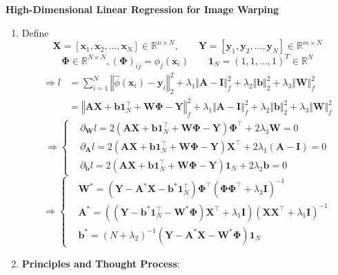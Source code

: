 \documentclass[11pt,letter,notitlepage]{article}
\begin{document}
\begin{solution} \textbf{High-Dimensional Linear Regression for Image Warping}
\begin{enumerate}
	\item
	Define
	\[
	\mathbf{X}
	=
	[\mathbf{x}_1, \mathbf{x}_2, \dots, \mathbf{x}_N] \in \mathbb{R}^{n \times N},
	\qquad
	\mathbf{Y} = [\mathbf{y}_1, \mathbf{y}_2, \dots, \mathbf{y}_N] \in \mathbb{R}^{m \times N}
	\]
	\[
	\mathbf{\Phi} \in \mathbb{R}^{N \times N}, (\mathbf{\Phi})_{ij} = \phi_j(\mathbf{x}_i)
	\qquad
	\mathbf{1}_N = (1,1,\dots,1)^T \in \mathbb{R}^N
	\]
	\begin{align*}
	\Longrightarrow
	l
	&=
	\sum_{i = 1}^N\left\Vert \hat{\phi}(\mathbf{x}_i) - \mathbf{y}_i \right\Vert _2^2 + \lambda_1\Vert \mathbf{A} - \mathbf{I}\Vert_f^2 + \lambda_2 \Vert\mathbf{b} \Vert _2^2 + \lambda_3\Vert \mathbf{W}\Vert_f^2\\
	&=
	\left\Vert \mathbf{A}\mathbf{X} + \mathbf{b}\mathbf{1}_N^\top + \mathbf{W} \mathbf{\Phi} - \mathbf{Y} \right\Vert _f^2
	+
	\lambda_1\Vert \mathbf{A} - \mathbf{I}\Vert_f^2
	+
	\lambda_2 \Vert\mathbf{b} \Vert _2^2
	+
	\lambda_3\Vert \mathbf{W}\Vert_f^2
	\end{align*}
	\begin{equation}
	\nonumber
	\Longrightarrow
	\left\{
	\begin{aligned}
	&\partial_\mathbf{W} l
	=
	2\left(\mathbf{A}\mathbf{X} + \mathbf{b}\mathbf{1}_N^\top + \mathbf{W} \mathbf{\Phi} - \mathbf{Y}\right) \mathbf{\Phi}^\top + 2\lambda_3 \mathbf{W}
	=
	0\\
	&\partial_\mathbf{A} l
	=
	2\left(\mathbf{A}\mathbf{X} + \mathbf{b}\mathbf{1}_N^\top + \mathbf{W} \mathbf{\Phi} - \mathbf{Y}\right) \mathbf{X}^\top + 2\lambda_1 (\mathbf{A} - \mathbf{I})
	=
	0\\
	&\partial_\mathbf{b} l
	=
	2\left(\mathbf{A}\mathbf{X} + \mathbf{b}\mathbf{1}_N^\top + \mathbf{W} \mathbf{\Phi} - \mathbf{Y}\right) \mathbf{1}_N + 2\lambda_2 \mathbf{b}
	=
	0
	\end{aligned}
	\right.
	\end{equation}
	\begin{equation}
	\nonumber
	\Longrightarrow
	\left\{
	\begin{aligned}
	&\mathbf{W}^*
	=
	\left(\mathbf{Y} - \mathbf{A}^*\mathbf{X} - \mathbf{b}^*\mathbf{1}_N^\top\right) \mathbf{\Phi}^\top
	\left(\mathbf{\Phi} \mathbf{\Phi}^\top + \lambda_3 \mathbf{I}\right)^{-1}\\
	&\mathbf{A}^*
	=
	\left(\left(\mathbf{Y} - \mathbf{b}^* \mathbf{1}_N^\top - \mathbf{W}^* \mathbf{\Phi}\right) \mathbf{X}^\top + \lambda_1 \mathbf{I}\right) \left(\mathbf{X} \mathbf{X}^\top + \lambda_1 \mathbf{I}\right)^{-1}\\
	&\mathbf{b}^*
	=
	\left(N + \lambda_2\right)^{-1} \left(\mathbf{Y} - \mathbf{A}^* \mathbf{X} - \mathbf{W}^* \mathbf{\Phi}\right) \mathbf{1}_N
	\end{aligned}
	\right.
	\end{equation}
	\item
	\textbf{Principles and Thought Process}:
	

\end{enumerate}
\end{solution}
\end{document}
